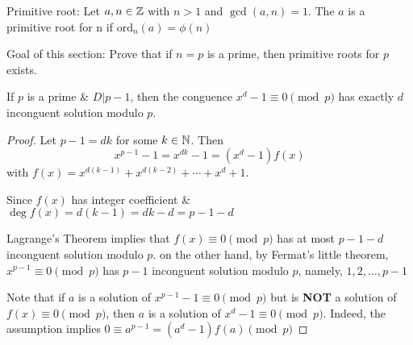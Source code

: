 Primitive root:
Let $a, n \in \mathbb{Z}$ with $n > 1$ and $\gcd(a, n) = 1$. The 
$a$ is a primitive root for n if $\text{ord}_n(a) = \phi(n)$

Goal of this section: 
Prove that if $n = p$ is a prime, then primitive roots for $p$ exists.

\begin{corollary}
    If $p$ is a prime \& $D|p-1$, then the conguence $x^d - 1 \equiv 0 \pmod p$ has exactly $d$
    inconguent solution modulo $p$.
\end{corollary}
\begin{proof}
    Let $p - 1 = dk$ for some $k \in \mathbb{N}$.
    Then
    \[
        x^{p-1}-1 = x^{dk}-1 = (x^d - 1)f(x)
    \]
    with $f(x) = x^{d(k-1)} + x^{d(k-2)} + \cdots + x^d + 1$.

    Since $f(x)$ has integer coefficient \& $\deg f(x) = d(k-1) = dk-d = p-1-d$

    Lagrange's Theorem implies that $f(x) \equiv 0 \pmod p$ has at most $p-1-d$ inconguent solution modulo $p$.
    on the other hand, by Fermat's little theorem, $x^{p-1} \equiv 0 \pmod p$ has $p-1$ inconguent solution modulo $p$, namely, $1, 2, \dots, p-1$

    Note that if $a$ is a solution of $x^{p-1}-1 \equiv 0 \pmod p$ but is \textbf{NOT} a solution of $f(x) \equiv 0 \pmod p$,
    then $a$ is a solution of $x^d-1 \equiv 0 \pmod p$. 
    Indeed, the assumption implies $0 \equiv a^{p-1} = (a^d - 1)f(a) \pmod p$

    
\end{proof}